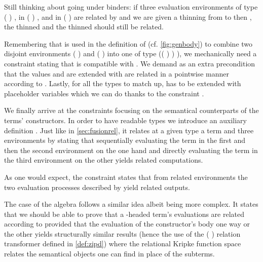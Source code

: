Still thinking about going under binders: if three evaluation environments
 of type
{( )  }, 
in {( )  },
and  in {( )  }
are related by  and we are
given a thinning  from  to  then ,
the thinned  and the
thinned  should still be related.


Remembering that  is used in the definition
of  (cf. \cref{fig:genbody})
to combine two disjoint environments {( )  } and
{( )  } into one of type
{(( \AF{++} ) )  )}, we mechanically need a
constraint stating that  is compatible with
. We demand
as an extra precondition that the values  and  are extended
with are related in a pointwise manner according to . Lastly, for all
the types to match up,  has to be extended with placeholder variables
which we can do thanks to the  constraint .


We finally arrive at the constraints focusing on the semantical counterparts
of the terms' constructors. In order to have readable types we introduce an
auxiliary definition . Just like in \cref{sec:fusionrel}, it relates at
a given type a term and three environments by stating that sequentially evaluating
the term in the first and then the second environment on the one hand and directly
evaluating the term in the third environment on the other yields related computations.


As one would expect, the  constraint states that from related environments
the two evaluation processes described by  yield related outputs.


The case of the algebra follows a similar idea albeit being more complex.
It states that we should be able to prove that a -headed term's
evaluations are related according to  provided that the evaluation
of the constructor's body one way or the other yields structurally similar
results (hence the use of the ({  })
relation transformer defined in \cref{def:zipd}) where the relational
Kripke function space relates the semantical objects one can find in place
of the subterms.

